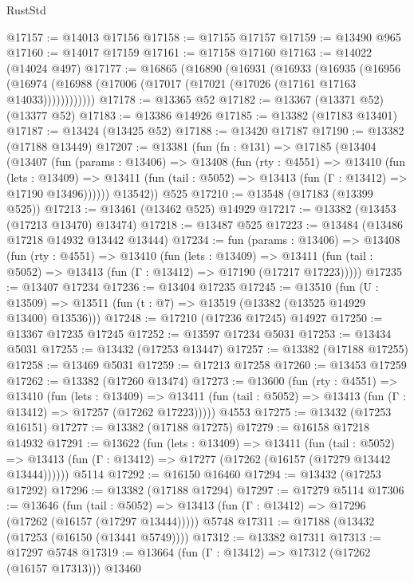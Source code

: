 \begin{lexlean}{RustStd}
\begin{coremodule}
@17157 := @14013 @17156
@17158 := @17155 @17157
@17159 := @13490 @965
@17160 := @14017 @17159
@17161 := @17158 @17160
@17163 := @14022 (@14024 @497)
@17177 := @16865
    (@16890
      (@16931
        (@16933
          (@16935
            (@16956
              (@16974 (@16988 (@17006 (@17017 (@17021 (@17026 (@17161 @17163 @14033))))))))))))
@17178 := @13365 @52
@17182 := @13367 (@13371 @52) (@13377 @52)
@17183 := @13386 @14926
@17185 := @13382 (@17183 @13401)
@17187 := @13424 (@13425 @52)
@17188 := @13420 @17187
@17190 := @13382 (@17188 @13449)
@17207 := @13381
    (fun (fn : @131) =>
    @17185
      (@13404
        (@13407
          (fun (params : @13406) =>
          @13408
            (fun (rty : @4551) =>
            @13410
              (fun (lets : @13409) =>
              @13411 (fun (tail : @5052) => @13413 (fun (Γ : @13412) => @17190 @13496))))))
        @13542))
    @525
@17210 := @13548 (@17183 (@13399 @525))
@17213 := @13461 (@13462 @525) @14929
@17217 := @13382 (@13453 (@17213 @13470) @13474)
@17218 := @13487 @525
@17223 := @13484 (@13486 @17218 @14932 @13442 @13444)
@17234 := fun (params : @13406) =>
  @13408
    (fun (rty : @4551) =>
    @13410
      (fun (lets : @13409) =>
      @13411 (fun (tail : @5052) => @13413 (fun (Γ : @13412) => @17190 (@17217 @17223)))))
@17235 := @13407 @17234
@17236 := @13404 @17235
@17245 := @13510
    (fun (U : @13509) => @13511 (fun (t : @7) => @13519 (@13382 (@13525 @14929 @13400) @13536)))
@17248 := @17210 (@17236 @17245) @14927
@17250 := @13367 @17235 @17245
@17252 := @13597 @17234 @5031
@17253 := @13434 @5031
@17255 := @13432 (@17253 @13447)
@17257 := @13382 (@17188 @17255)
@17258 := @13469 @5031
@17259 := @17213 @17258
@17260 := @13453 @17259
@17262 := @13382 (@17260 @13474)
@17273 := @13600
    (fun (rty : @4551) =>
    @13410
      (fun (lets : @13409) =>
      @13411 (fun (tail : @5052) => @13413 (fun (Γ : @13412) => @17257 (@17262 @17223)))))
    @4553
@17275 := @13432 (@17253 @16151)
@17277 := @13382 (@17188 @17275)
@17279 := @16158 @17218 @14932
@17291 := @13622
    (fun (lets : @13409) =>
    @13411
      (fun (tail : @5052) =>
      @13413 (fun (Γ : @13412) => @17277 (@17262 (@16157 (@17279 @13442 @13444))))))
    @5114
@17292 := @16150 @16460
@17294 := @13432 (@17253 @17292)
@17296 := @13382 (@17188 @17294)
@17297 := @17279 @5114
@17306 := @13646
    (fun (tail : @5052) => @13413 (fun (Γ : @13412) => @17296 (@17262 (@16157 (@17297 @13444)))))
    @5748
@17311 := @17188 (@13432 (@17253 (@16150 (@13441 @5749))))
@17312 := @13382 @17311
@17313 := @17297 @5748
@17319 := @13664 (fun (Γ : @13412) => @17312 (@17262 (@16157 @17313))) @13460

\end{coremodule}
\end{lexlean}
